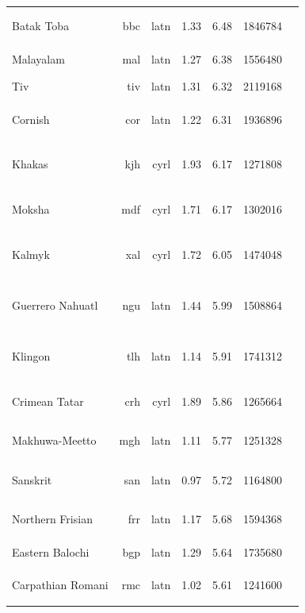 \documentclass[11pt]{article}
\begin{document}
\begin{center}
\begin{longtable}[width=0.9\textwidth]{|lrrrrrl|}
Batak Toba & bbc & latn & 1.33 & 6.48 & 1846784 & {\color{madlad400}\rule{3.94cm}{8pt}}{\color{other}\rule{0.06000000000000005cm}{8pt}} \\ 
Malayalam & mal & latn & 1.27 & 6.38 & 1556480 & {\color{madlad400}\rule{4.0cm}{8pt}} \\ 
Tiv & tiv & latn & 1.31 & 6.32 & 2119168 & {\color{madlad400}\rule{4.0cm}{8pt}} \\ 
Cornish & cor & latn & 1.22 & 6.31 & 1936896 & {\color{madlad400}\rule{2.84cm}{8pt}}{\color{other}\rule{1.1600000000000001cm}{8pt}} \\ 
Khakas & kjh & cyrl & 1.93 & 6.17 & 1271808 & {\color{madlad400}\rule{1.3cm}{8pt}}{\color{glot500}\rule{1.42cm}{8pt}}{\color{other}\rule{1.2800000000000002cm}{8pt}} \\ 
Moksha & mdf & cyrl & 1.71 & 6.17 & 1302016 & {\color{madlad400}\rule{3.18cm}{8pt}}{\color{other}\rule{0.8199999999999998cm}{8pt}} \\ 
Kalmyk & xal & cyrl & 1.72 & 6.05 & 1474048 & {\color{oscar}\rule{0.01cm}{8pt}}{\color{madlad400}\rule{0.87cm}{8pt}}{\color{other}\rule{3.12cm}{8pt}} \\ 
Guerrero Nahuatl & ngu & latn & 1.44 & 5.99 & 1508864 & {\color{madlad400}\rule{3.23cm}{8pt}}{\color{glot500}\rule{0.38cm}{8pt}}{\color{other}\rule{0.3900000000000001cm}{8pt}} \\ 
Klingon & tlh & latn & 1.14 & 5.91 & 1741312 & {\color{madlad400}\rule{3.75cm}{8pt}}{\color{glot500}\rule{0.05cm}{8pt}}{\color{other}\rule{0.20000000000000018cm}{8pt}} \\ 
Crimean Tatar & crh & cyrl & 1.89 & 5.86 & 1265664 & {\color{madlad400}\rule{3.59cm}{8pt}}{\color{glot500}\rule{0.41000000000000014cm}{8pt}} \\ 
Makhuwa-Meetto & mgh & latn & 1.11 & 5.77 & 1251328 & {\color{madlad400}\rule{3.42cm}{8pt}}{\color{other}\rule{0.5800000000000001cm}{8pt}} \\ 
Sanskrit & san & latn & 0.97 & 5.72 & 1164800 & {\color{glot500}\rule{0.04cm}{8pt}}{\color{other}\rule{3.96cm}{8pt}} \\ 
Northern Frisian & frr & latn & 1.17 & 5.68 & 1594368 & {\color{glot500}\rule{2.07cm}{8pt}}{\color{other}\rule{1.9300000000000002cm}{8pt}} \\ 
Eastern Balochi & bgp & latn & 1.29 & 5.64 & 1735680 & {\color{madlad400}\rule{4.0cm}{8pt}} \\ 
Carpathian Romani & rmc & latn & 1.02 & 5.61 & 1241600 & {\color{madlad400}\rule{1.81cm}{8pt}}{\color{other}\rule{2.19cm}{8pt}} \\ 

\end{longtable}
\end{center}
\end{document}
